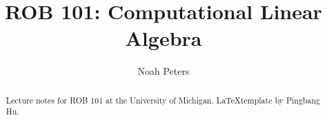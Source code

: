 \documentclass[a4paper]{report}
\author{Noah Peters}
\title{ROB 101: Computational Linear Algebra}
\begin{document}
\maketitle

\begin{abstract}
	Lecture notes for ROB 101 at the University of Michigan.
	\LaTeX   template by Pingbang Hu.
\end{abstract}

\newpage

\tableofcontents


\newpage
\appendix
\appendixpage



\newpage
\printbibliography
\end{document}
